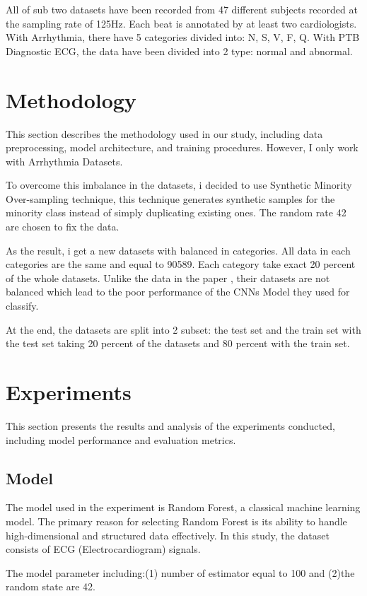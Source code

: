 \documentclass[10pt, conference]{IEEEtran}
\begin{document}
	\par All of sub two datasets have been recorded from 47
	different subjects recorded at the sampling rate of 125Hz.
	Each beat is annotated by at least two cardiologists. With Arrhythmia, there have 5 categories divided into: N, S, V, F, Q.
	With PTB Diagnostic ECG, the data have been divided into 2 type: normal and abnormal.
	
	\section{Methodology}
	This section describes the methodology used in our study, including data preprocessing, model architecture, and training procedures. However, I only work with Arrhythmia Datasets.
	
\par To overcome this imbalance in the datasets, i decided to use Synthetic Minority Over-sampling technique, this technique generates synthetic samples for the minority class instead of simply duplicating existing ones. The random rate 42 are chosen to fix the data.
	\par As the result, i get a new datasets with balanced in categories. All data in each categories are the same and equal to 90589. Each category take exact 20 percent of the whole datasets. Unlike the data in the paper \cite{example3}, their datasets are not balanced which lead to the poor performance of the CNNs Model they used for classify.
	\par At the end, the datasets are split into 2 subset: the test set and the train set with the test set taking 20 percent of the datasets and 80 percent with the train set.
	
	\section{Experiments}
	This section presents the results and analysis of the experiments conducted, including model performance and evaluation metrics.
	\subsection{Model}
	The model used in the experiment is Random Forest, a classical machine learning model. The primary reason for selecting Random Forest is its ability to handle high-dimensional and structured data effectively. In this study, the dataset consists of ECG (Electrocardiogram) signals.
	
	\par The model parameter including:(1) number of estimator equal to 100 and (2)the random state are 42.
	
\end{document}
